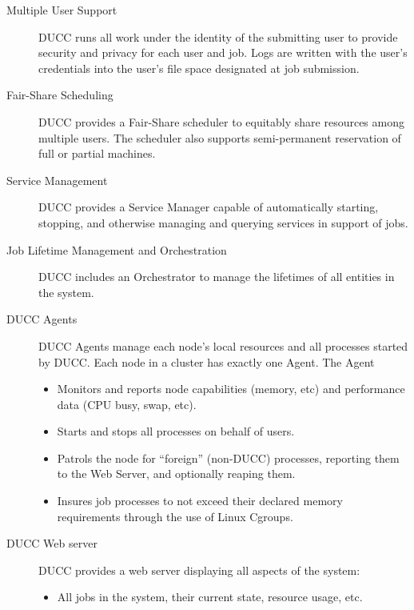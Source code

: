     \begin{description}
        \item[Multiple User Support] DUCC runs all work under the identity of the submitting user to
          provide security and privacy for each user and job. Logs are written with the
          user's credentials into the user's file space designated at job submission.

        \item[Fair-Share Scheduling] DUCC provides a Fair-Share scheduler to equitably share
          resources among multiple users.  The scheduler also supports semi-permanent reservation of
          full or partial machines.

        \item[Service Management] DUCC provides a Service Manager capable of automatically starting, stopping, and
          otherwise managing and querying services in support of jobs.

        \item[Job Lifetime Management and Orchestration] DUCC includes an Orchestrator to manage the
          lifetimes of all entities in the system.
          
        \item[DUCC Agents] DUCC Agents manage each node's local resources and all
          processes started by DUCC. Each node in a cluster has exactly one Agent. The Agent
          \begin{itemize}
            \item Monitors and reports node capabilities (memory, etc) and performance data (CPU busy,
              swap, etc).
            \item Starts and stops all processes on behalf of users.
            \item Patrols the node for ``foreign'' (non-DUCC) processes, reporting them to the
              Web Server, and optionally reaping them.
            \item Insures job processes to not exceed their declared memory requirements
              through the use of Linux Cgroups.
          \end{itemize}

        \item[DUCC Web server] DUCC  provides a web server displaying all aspects of the system:
          \begin{itemize}
              \item All jobs in the system, their current state, resource usage, etc.
                

\end{itemize}
\end{description}
